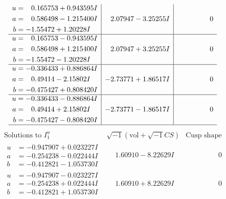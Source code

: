 \documentclass[1p]{elsarticle_modified}
\theoremstyle{definition}
\newcommand{\I}{\sqrt{-1}}
\begin{document}
$$\begin{array}{c|c|c}
\begin{aligned}
u &= \phantom{-}0.165753 + 0.943595 I \\
a &= \phantom{-}0.586498 - 1.215400 I \\
b &= -1.55472 + 1.20228 I\end{aligned}
 & \phantom{-}2.07947 - 3.25255 I & \phantom{-0.000000 } 0 \\ \hline\begin{aligned}
u &= \phantom{-}0.165753 - 0.943595 I \\
a &= \phantom{-}0.586498 + 1.215400 I \\
b &= -1.55472 - 1.20228 I\end{aligned}
 & \phantom{-}2.07947 + 3.25255 I & \phantom{-0.000000 } 0 \\ \hline\begin{aligned}
u &= -0.336433 + 0.886864 I \\
a &= \phantom{-}0.49414 - 2.15802 I \\
b &= -0.475427 + 0.808420 I\end{aligned}
 & -2.73771 + 1.86517 I & \phantom{-0.000000 } 0 \\ \hline\begin{aligned}
u &= -0.336433 - 0.886864 I \\
a &= \phantom{-}0.49414 + 2.15802 I \\
b &= -0.475427 - 0.808420 I\end{aligned}
 & -2.73771 - 1.86517 I & \phantom{-0.000000 } 0\\
 \hline 
 \end{array}$$\newpage$$\begin{array}{c|c|c}  
\text{Solutions to }I^u_{1}& \I (\text{vol} + \sqrt{-1}CS) & \text{Cusp shape}\\
 \hline 
\begin{aligned}
u &= -0.947907 + 0.023227 I \\
a &= -0.254238 - 0.022444 I \\
b &= -0.412821 - 1.053730 I\end{aligned}
 & \phantom{-}1.60910 - 8.22629 I & \phantom{-0.000000 } 0 \\ \hline\begin{aligned}
u &= -0.947907 - 0.023227 I \\
a &= -0.254238 + 0.022444 I \\
b &= -0.412821 + 1.053730 I\end{aligned}
 & \phantom{-}1.60910 + 8.22629 I & \phantom{-0.000000 } 0 \\ \hline\begin{aligned}

\end{aligned}
\end{array}$$
\end{document}
